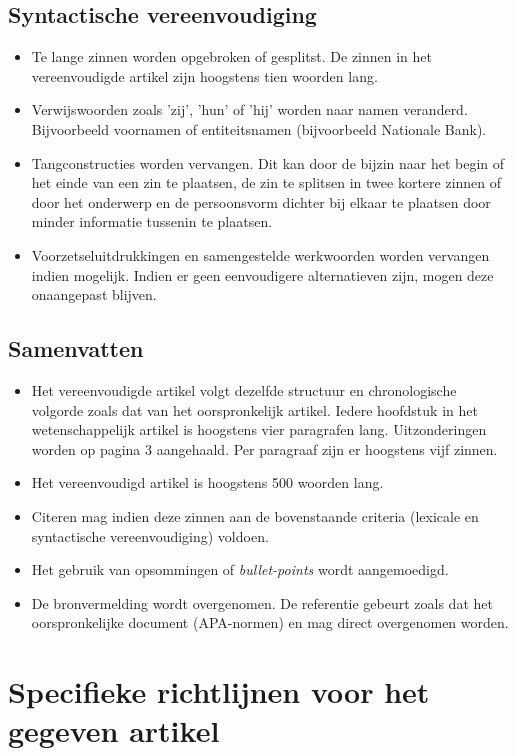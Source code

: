 \documentclass{report}
\begin{document}
	\section{Syntactische vereenvoudiging}
	
	\begin{itemize}
		\item Te lange zinnen worden opgebroken of gesplitst. De zinnen in het vereenvoudigde artikel zijn hoogstens tien woorden lang.
		\item Verwijswoorden zoals 'zij', 'hun' of 'hij' worden naar namen veranderd. Bijvoorbeeld voornamen of entiteitsnamen (bijvoorbeeld Nationale Bank). 
		\item Tangconstructies worden vervangen. Dit kan door de bijzin naar het begin of het einde van een zin te plaatsen, de zin te splitsen in twee kortere zinnen of door het onderwerp en de persoonsvorm dichter bij elkaar te plaatsen door minder informatie tussenin te plaatsen.
		\item Voorzetseluitdrukkingen en samengestelde werkwoorden worden vervangen indien mogelijk. Indien er geen eenvoudigere alternatieven zijn, mogen deze onaangepast blijven.
	\end{itemize}
	
	\section{Samenvatten}
	
	\begin{itemize}
		\item Het vereenvoudigde artikel volgt dezelfde structuur en chronologische volgorde zoals dat van het oorspronkelijk artikel. Iedere hoofdstuk in het wetenschappelijk artikel is hoogstens vier paragrafen lang. Uitzonderingen worden op pagina 3 aangehaald. Per paragraaf zijn er hoogstens vijf zinnen.
		\item Het vereenvoudigd artikel is hoogstens 500 woorden lang. 
		\item Citeren mag indien deze zinnen aan de bovenstaande criteria (lexicale en syntactische vereenvoudiging) voldoen.
		\item Het gebruik van opsommingen of \textit{bullet-points} wordt aangemoedigd.
		\item De bronvermelding wordt overgenomen. De referentie gebeurt zoals dat het oorspronkelijke document (APA-normen) en mag direct overgenomen worden.
	\end{itemize}

	\chapter{Specifieke richtlijnen voor het gegeven artikel}
	
\end{document}
